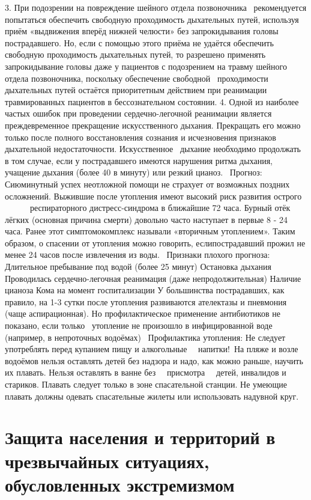 \documentclass[a4paper, 12pt]{article}
\theoremstyle{definition}
\begin{document}
        3. При подозрении на повреждение шейного отдела позвоночника  рекомендуется попытаться обеспечить свободную проходимость дыхательных путей, используя приём «выдвижения вперёд нижней челюсти» без запрокидывания головы пострадавшего. Но, если с помощью этого приёма не удаётся обеспечить свободную проходимость дыхательных путей, то разрешено применять запрокидывание головы даже у пациентов с подозрением на травму шейного отдела позвоночника, поскольку обеспечение свободной  проходимости дыхательных путей остаётся приоритетным действием при реанимации травмированных пациентов в бессознательном состоянии.
        4. Одной из наиболее частых ошибок при проведении сердечно-легочной реанимации является преждевременное прекращение искусственного дыхания. Прекращать его можно только после полного восстановления сознания и исчезновения признаков дыхательной недостаточности. Искусственное  дыхание необходимо продолжать в том случае, если у пострадавшего имеются нарушения ритма дыхания, учащение дыхания (более 40 в минуту) или резкий цианоз.
         Прогноз:
        Сиюминутный успех неотложной помощи не страхует от возможных поздних осложнений.
        Выжившие после утопления имеют высокий риск развития острого       респираторного дистресс-синдрома в ближайшие 72 часа. Бурный отёк лёгких (основная причина смерти) довольно часто наступает в первые 8 - 24 часа. Ранее этот симптомокомплекс называли «вторичным утоплением».
        Таким образом, о спасении от утопления можно говорить, еслипострадавший прожил не менее 24 часов после извлечения из воды.
         Признаки плохого прогноза:
        Длительное пребывание под водой (более 25 минут)
        Остановка дыхания
        Проводилась сердечно-легочная реанимация (даже непродолжительная)
        Наличие цианоза
        Кома на момент госпитализации
        У большинства пострадавших, как правило, на 1-3 сутки после утопления развиваются ателектазы и пневмония (чаще аспирационная). Но профилактическое применение антибиотиков не показано, если только  утопление не произошло в инфицированной воде (например, в непроточных водоёмах)
         Профилактика утопления:
        Не следует употреблять перед купанием пищу и алкогольные   напитки! На пляже и возле водоёмов нельзя оставлять детей без надзора и надо, как можно раньше, научить их плавать. Нельзя оставлять в ванне без   присмотра   детей, инвалидов и стариков.
        Плавать следует только в зоне спасательной станции. Не умеющие плавать должны одевать спасательные жилеты или использовать надувной круг.
         
        \section{Защита населения и территорий в чрезвычайных ситуациях, обусловленных экстремизмом}
\end{document}
